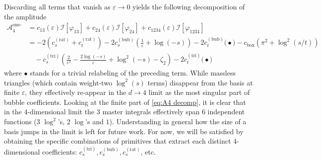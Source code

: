 \documentclass[11pt]{article}
\newcommand{\nn}{\nonumber}
\newcommand{\vphi}{\varphi}
\newcommand{\vep}{\varepsilon}
\begin{document}
Discarding all terms that vanish as $\vep\to0$ yields the following decomposition of the amplitude
\begin{align} \label{eq:A4 decomp}
	\mathcal{A}_4^{\text{one-loop}}
	&= c_{13}(\vep) \mathscr{I}[\vphi_{13}]
	+ c_{24}(\vep) \mathscr{I}[\vphi_{24}]
	+ c_{1234}(\vep) \mathscr{I}[\vphi_{1234}]
	\nn\\&
	= -2\left(c_{s}^{(\text{rat})} + c_{t}^{(\text{rat})}\right)
	 -2 c_{s}^{(\text{bub})}\left(\frac{1}{\vep} + \log(-s)\right) -2c_t^{(\text{bub})}\Big(\bullet\Big)-c_{\text{box}} \left(\pi^2 + \log^2(s/t) \right)
\nn\\&\quad -c_{s}^{(\text{tri})}\left(\frac{2}{\vep^2} -\frac{2\log(-s)}{\vep} + \log^2(-s)-\zeta_2\right) -2c_t^{(\text{tri})}\Big(\bullet\Big)
\end{align}
where $\bullet$ stands for a trivial relabeling of the preceding term.
While massless triangles (which contain weight-two $\log^2(s)$ terms) disappear from the basis at finite $\vep$,
they effectively re-appear in the $d\to 4$ limit as the most singular part of bubble coefficients.
Looking at the finite part of \eqref{eq:A4 decomp}, it is clear that in the 4-dimensional limit the 3 master integrals
effectively span 6 independent functions (3 $\log^2$'s, 2 $\log$'s and $1$).
Understanding in general how the size of a basis jumps in the limit is left for future work.
For now, we will be satisfied by obtaining the specific combinations of primitives that extract each distinct 4-dimensional coefficients: $c_{s}^{(\text{tri})}, c_{s}^{(\text{bub})}, c_{s}^{(\text{rat})}$, etc.
\end{document}
